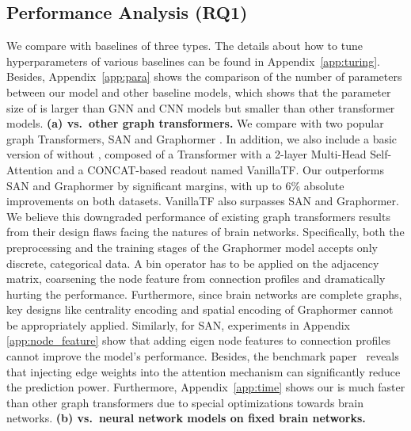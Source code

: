 \subsection{Performance Analysis (RQ1)}
We compare \methodtable with baselines of three types. The details about how to tune hyperparameters of various baselines can be found in Appendix~\ref{app:turing}. Besides, Appendix~\ref{app:para} shows the comparison of the number of parameters between our model and other baseline models, which shows that the parameter size of \methodtable is larger than GNN and CNN models but smaller than other transformer models.
\textbf{(a) \methodtable vs.~other graph transformers.}
We compare \methodtable with two popular graph Transformers, SAN \citep{san} and Graphormer \citep{graphormer}. In addition, we also include a basic version of \methodtable without \poolingshort, composed of a Transformer with a 2-layer Multi-Head Self-Attention and a CONCAT-based readout named VanillaTF. Our \methodtable outperforms SAN and Graphormer by significant margins, with up to 6\% absolute improvements on both datasets. VanillaTF also surpasses SAN and Graphormer. We believe this downgraded performance of existing graph transformers results from their design flaws facing the natures of brain networks. Specifically, both the preprocessing and the training stages of the Graphormer model accepts only discrete, categorical data. A bin operator has to be applied on the adjacency matrix, coarsening the node feature from connection profiles and dramatically hurting the performance. Furthermore, since brain networks are complete graphs, key designs like centrality encoding and spatial encoding of Graphormer cannot be appropriately applied. Similarly, for SAN, experiments in Appendix \ref{app:node_feature} show that adding eigen node features to connection profiles cannot improve the model's performance. Besides, the benchmark paper~\citep{braingb} reveals that injecting edge weights into the attention mechanism can significantly reduce the prediction power. Furthermore, Appendix~\ref{app:time} shows our \methodtable is much faster than other graph transformers due to special optimizations towards brain networks. \textbf{(b) \methodtable vs.~neural network models on fixed brain networks.}
